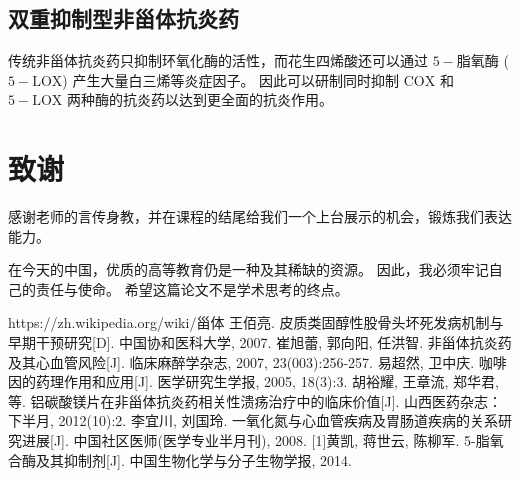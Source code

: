 \documentclass[12pt, a4paper, oneside]{ctexart}
\begin{document}
\subsection{双重抑制型非甾体抗炎药}
传统非甾体抗炎药只抑制环氧化酶的活性，而花生四烯酸还可以通过 $\mathrm{5-}$脂氧酶 ($\mathrm{5-LOX}$) 产生大量白三烯等炎症因子\cite{ref7}。
因此可以研制同时抑制 $\mathrm{COX}$ 和 $\mathrm{5-LOX}$ 两种酶的抗炎药以达到更全面的抗炎作用。

\newpage
\section*{致谢}
感谢老师的言传身教，并在课程的结尾给我们一个上台展示的机会，锻炼我们表达能力。

在今天的中国，优质的高等教育仍是一种及其稀缺的资源。
因此，我必须牢记自己的责任与使命。
希望这篇论文不是学术思考的终点。

\begin{thebibliography}{99}

    https://zh.wikipedia.org/wiki/甾体
    王佰亮. 皮质类固醇性股骨头坏死发病机制与早期干预研究[D]. 中国协和医科大学, 2007.
    崔旭蕾, 郭向阳, 任洪智. 非甾体抗炎药及其心血管风险[J]. 临床麻醉学杂志, 2007, 23(003):256-257.
    易超然, 卫中庆. 咖啡因的药理作用和应用[J]. 医学研究生学报, 2005, 18(3):3.
    胡裕耀, 王章流, 郑华君,等. 铝碳酸镁片在非甾体抗炎药相关性溃疡治疗中的临床价值[J]. 山西医药杂志：下半月, 2012(10):2.
    李宜川, 刘国玲. 一氧化氮与心血管疾病及胃肠道疾病的关系研究进展[J]. 中国社区医师(医学专业半月刊), 2008.
    [1]黄凯, 蒋世云, 陈柳军. 5-脂氧合酶及其抑制剂[J]. 中国生物化学与分子生物学报, 2014.
    
\end{thebibliography}
\end{document}
